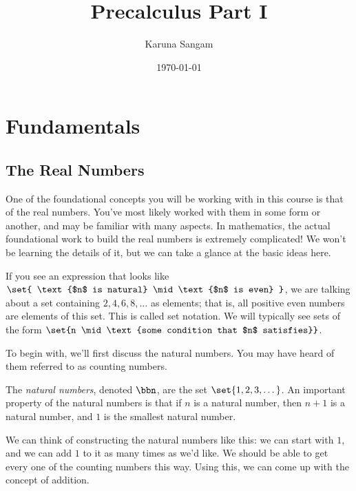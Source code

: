 \documentclass[boxes,serif]{seastaralgebras_expository}
\title{Precalculus Part I}
\author{Karuna Sangam} %
\date{\today} %
\renewcommand{\sth}{\mid}
\begin{document}
\maketitle


\section{Fundamentals}


\subsection{The Real Numbers}

One of the foundational concepts you will be working with in this course is that of the real numbers. You've most likely worked with them in some form or another, and may be familiar with many aspects. In mathematics, the actual foundational work to build the real numbers is extremely complicated! We won't be learning the details of it, but we can take a glance at the basic ideas here.

\begin{note}
    If you see an expression that looks like $\set{ \text{$n$ is natural} \sth \text{$n$ is even} }$, we are talking about a set containing $2, 4, 6, 8, \dots$ as elements; that is, all positive even numbers are elements of this set. This is called set notation. We will typically see sets of the form $\set{n \sth \text{some condition that $n$ satisfies}}$.
\end{note}

To begin with, we'll first discuss the natural numbers. You may have heard of them referred to as counting numbers.

\begin{defn} \label{def:natural}
    The \emph{natural numbers}, denoted $\bbn$, are the set $\set{1, 2, 3, \dots }$. An important property of the natural numbers is that if $n$ is a natural number, then $n+1$ is a natural number, and $1$ is the smallest natural number.
\end{defn}

We can think of constructing the natural numbers like this: we can start with $1$, and we can add $1$ to it as many times as we'd like. We should be able to get every one of the counting numbers this way. Using this, we can come up with the concept of addition.
\end{document}
